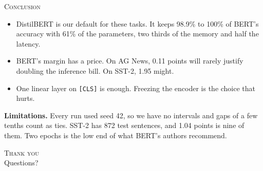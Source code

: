 \documentclass[xcolor={dvipsnames,table}, aspectratio=1610]{beamer}
\begin{document}
\begin{frame}{\textsc{Conclusion}}

  \begin{itemize}\small
    \item DistilBERT is our default for these tasks. It keeps 98.9\% to 100\%
      of BERT's accuracy with 61\% of the parameters, two thirds of the memory
      and half the latency.
    \item BERT's margin has a price. On AG News, 0.11 points will rarely
      justify doubling the inference bill. On SST-2, 1.95 might.
    \item One linear layer on \texttt{[CLS]} is enough. Freezing the encoder
      is the choice that hurts.
  \end{itemize}

  \vspace{3mm}
  \begin{ProblemBox}
    \scriptsize\textbf{Limitations.} Every run used seed 42, so we have no
    intervals and gaps of a few tenths count as ties. SST-2 has 872 test
    sentences, and 1.04 points is nine of them. Two epochs is the low end of
    what BERT's authors recommend.
  \end{ProblemBox}

\end{frame}

\begin{frame}[plain]
  \centering\vfill
  {\Huge\textsc{Thank you}}\\[6mm]
  {\large Questions?}
  \vfill
\end{frame}
\end{document}
